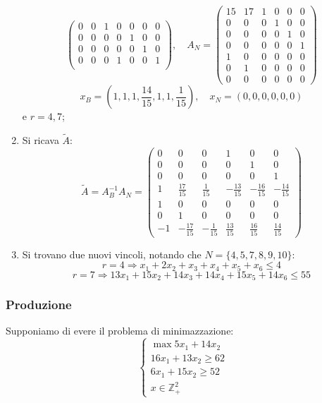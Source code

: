 \documentclass[a4paper,11pt]{article}
\begin{document}
\begin{enumerate}
$$\begin{pmatrix}
		0 & 0 & 1 & 0 & 0 & 0 & 0 \\
		0 & 0 & 0 & 0 & 1 & 0 & 0 \\
		0 & 0 & 0 & 0 & 0 & 1 & 0 \\
		0 & 0 & 0 & 1 & 0 & 0 & 1 \\
	\end{pmatrix}, \quad 
	A_N = 
	\begin{pmatrix}
		15 & 17 & 1 & 0 & 0 & 0 \\ 
		0 & 0 & 0 & 1 & 0 & 0 \\ 
		0 & 0 & 0 & 0 & 1 & 0 \\ 
		0 & 0 & 0 & 0 & 0 & 1 \\ 
		1 & 0 & 0 & 0 & 0 & 0 \\ 
		0 & 1 & 0 & 0 & 0 & 0 \\
		0 & 0 & 0 & 0 & 0 & 0
	\end{pmatrix}
	$$
	$$
	x_B =
	\left(
		1, 1, 1, \frac{14}{15}, 1, 1, \frac{1}{15}
	\right), \quad 
	x_N = 
	\left(
		0, 0, 0, 0, 0, 0
	\right)
	$$
	e $r= 4, 7$;
\item Si ricava $\tilde{A}$:
	$$
	\tilde{A} = A_B^{-1} A_N = 
	\begin{pmatrix}
		0 & 0 & 0 & 1 & 0 & 0 \\ 
		0 & 0 & 0 & 0 & 1 & 0 \\ 
		0 & 0 & 0 & 0 & 0 & 1 \\ 
		1 & \frac{17}{15} & \frac{1}{15} & -\frac{13}{15} & -\frac{16}{15} & -\frac{14}{15} \\ 
		1 & 0 & 0 & 0 & 0 & 0 \\ 
		0 & 1 & 0 & 0 & 0 & 0 \\ 
		-1 & -\frac{17}{15} & -\frac{1}{15} & \frac{13}{15} & \frac{16}{15} & \frac{14}{15}
	\end{pmatrix} 
	$$
\item Si trovano due nuovi vincoli, notando che $N = \{ 4, 5, 7, 8, 9, 10 \}$:
$$
r=4 \Rightarrow x_1 + 2x_2 + x_3 + x_4 + x_5 + x_6 \leq 4 
$$
$$
r=7 \Rightarrow 13 x_1 + 15 x_2 + 14 x_3 + 14 x_4 + 15 x_5 + 14 x_6 \leq 55
$$
\end{enumerate}

\subsubsection{Produzione}
Supponiamo di evere il problema di minimazzazione:
\[
	\begin{cases}
		\max 5x_1 + 14x_2 \\ 
		16 x_1 + 13 x_2 \geq 62 \\ 
		6 x_1 + 15 x_2 \geq 52 \\ 
		x \in \mathbb{Z}^2_+
	\end{cases}
\]
\end{document}
